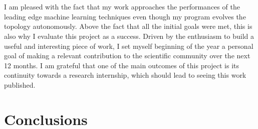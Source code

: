 \documentclass[a4paper,12pt, oneside]{memoir}
\begin{document}
\\ \\
I am pleased with the fact that my work approaches the performances of the leading edge machine learning techniques even though my program evolves the topology autonomously. Above the fact that all the initial goals were met, this is also why I evaluate this project as a success. Driven by the enthusiasm to build a useful and interesting piece of work, I set myself beginning of the year a personal goal of making a relevant contribution to the scientific community over the next 12 months. I am grateful that one of the main outcomes of this project is its continuity towards a research internship, which should lead to seeing this work published.

\chapter{Conclusions}
\end{document}
